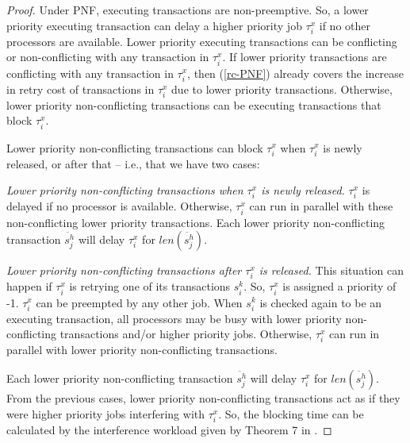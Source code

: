 \documentclass[twocolumn]{article}
\newtheorem{proof}{Proof}
\begin{document}
\begin{proof}\normalfont
Under PNF, executing transactions are non-preemptive. So, a lower priority executing transaction can delay a higher priority job $\tau_i^x$ if no other processors are available. Lower priority executing transactions can be conflicting or non-conflicting with any transaction in $\tau_{i}^{x}$. If lower priority transactions are conflicting with any transaction in $\tau_i^x$, then (\ref{rc-PNF}) already covers the increase in retry cost of transactions in $\tau_i^x$ due to lower priority transactions. Otherwise, lower priority non-conflicting transactions can be executing transactions that block $\tau_i^x$.

Lower priority non-conflicting transactions can block $\tau_i^x$ when $\tau_i^x$ is newly released, or after that -- i.e., that we have two cases:

\emph{Lower priority non-conflicting transactions when $\tau_i^x$ is newly released.} $\tau_i^x$ is delayed if no processor is available. Otherwise, $\tau_i^x$ can run in parallel with these non-conflicting lower priority transactions. Each lower priority non-conflicting transaction $\ddot{s_j^h}$ will delay $\tau_i^x$ for $len(\ddot{s_j^h})$.

\emph{Lower priority non-conflicting transactions after $\tau_i^x$ is released.} This situation can happen if $\tau_i^x$ is retrying one of its transactions $s_i^k$. So, $\tau_i^x$ is assigned a priority of -1. $\tau_i^x$ can be preempted by any other job. When $s_i^k$ is checked again to be an executing transaction, all processors may be busy with lower priority non-conflicting transactions and/or higher priority jobs. Otherwise, $\tau_i^x$ can run in parallel with  lower priority non-conflicting transactions.

Each lower priority non-conflicting transaction $\ddot{s_j^h}$ will delay $\tau_i^x$ for $len(\ddot{s_j^h})$. From the previous cases, lower priority non-conflicting transactions act as if they were higher priority jobs interfering with $\tau_{i}^{x}$. So, the blocking time can be calculated by the interference workload given by Theorem 7 in \cite{key-2}. 
\end{proof}
\end{document}
